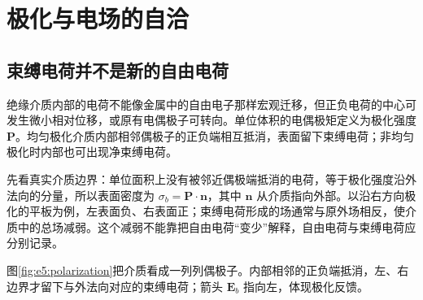 \section{极化与电场的自洽}
\subsection{束缚电荷并不是新的自由电荷}

绝缘介质内部的电荷不能像金属中的自由电子那样宏观迁移，但正负电荷的中心可发生微小相对位移，或原有电偶极子可转向。单位体积的电偶极矩定义为极化强度 $\bm P$。均匀极化介质内部相邻偶极子的正负端相互抵消，表面留下束缚电荷；非均匀极化时内部也可出现净束缚电荷。

先看真实介质边界：单位面积上没有被邻近偶极端抵消的电荷，等于极化强度沿外法向的分量，所以表面密度为 $\sigma_b=\bm P\cdot\bm n$，其中 $\bm n$ 从介质指向外部。以沿右方向极化的平板为例，左表面负、右表面正；束缚电荷形成的场通常与原外场相反，使介质中的总场减弱。这个减弱不能靠把自由电荷“变少”解释，自由电荷与束缚电荷应分别记录。

图\ref{fig:e5:polarization}把介质看成一列列偶极子。内部相邻的正负端抵消，左、右边界才留下与外法向对应的束缚电荷；箭头 $\bm E_b$ 指向左，体现极化反馈。

